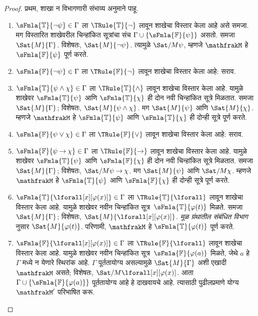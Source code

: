 \documentclass[11pt,a4paper,openany]{book}
\theoremstyle{definition}
\newcommand{\lif}{\mathbin{\to}}
\newcommand{\applytofirst}[2]{{\expandafter#1#2}}
\newcommand{\Struct}[1]{\applytofirst{\mathfrak}{#1}}
\newcommand{\True}{\ensuremath{\mathbb{T}}}
\newcommand{\False}{\ensuremath{\mathbb{F}}}
\newcommand{\readerexternalref}[1]{\textit{मूळ ग्रंथातील संबंधित विभाग}}
\begin{document}
\begin{proof}
प्रथम, शाखा न विभागणारी संभाव्य अनुमाने पाहू.
\begin{enumerate}
\item $\sFmla{\True}{\lnot \psi} \in \Gamma$ ला
  $\TRule{\True}{\lnot}$ लावून शाखेचा विस्तार केला आहे असे समजा. मग
  विस्तारित शाखेवरील चिन्हांकित सूत्रांचा संच $\Gamma \cup
  \{\sFmla{\False}{\psi}\}$ असतो. समजा
  $\Sat{M}{\Gamma}$. विशेषतः,
  $\Sat{M}{\lnot \psi}$. त्यामुळे
  $\Sat/{M}{\psi}$, म्हणजे
  $\Struct{M}$ हे
  $\sFmla{\False}{\psi}$ पूर्ण करते.
\item $\sFmla{\False}{\lnot \psi} \in \Gamma$ ला
  $\TRule{\False}{\lnot}$ लावून शाखेचा विस्तार केला आहे: सराव.
\item $\sFmla{\True}{\psi \land \chi} \in \Gamma$ ला
  $\TRule{\True}{\land}$ लावून शाखेचा विस्तार केला आहे. यामुळे शाखेवर
  $\sFmla{\True}{\psi}$ आणि $\sFmla{\True}{\chi}$ ही दोन नवी
  चिन्हांकित सूत्रे मिळतात. समजा
  $\Sat{M}{\Gamma}$; विशेषतः,
  $\Sat{M}{\psi \land \chi}$. मग
  $\Sat{M}{\psi}$ आणि
  $\Sat{M}{\chi}$. म्हणजे
  $\Struct{M}$ हे
  $\sFmla{\True}{\psi}$ आणि $\sFmla{\True}{\chi}$ ही दोन्ही सूत्रे पूर्ण करते.
\item $\sFmla{\False}{\psi \lor \chi} \in \Gamma$ ला
  $\TRule{\False}{\lor}$ लावून शाखेचा विस्तार केला आहे: सराव.
\item $\sFmla{\False}{\psi \lif \chi} \in \Gamma$ ला
  $\TRule{\False}{\lif}$ लावून शाखेचा विस्तार केला आहे. यामुळे शाखेवर
  $\sFmla{\True}{\psi}$ आणि $\sFmla{\False}{\chi}$ ही दोन नवी
  चिन्हांकित सूत्रे मिळतात. समजा
  $\Sat{M}{\Gamma}$; विशेषतः,
  $\Sat/{M}{\psi \lif \chi}$. मग
  $\Sat{M}{\psi}$ आणि
  $\Sat/{M}{\chi}$. म्हणजे
  $\Struct{M}$ हे
  $\sFmla{\True}{\psi}$ आणि $\sFmla{\False}{\chi}$ ही दोन्ही सूत्रे पूर्ण करते.


\item $\sFmla{\True}{\lforall[x][\varphi(x)]} \in \Gamma$ ला
  $\TRule{\True}{\lforall}$ लावून शाखेचा विस्तार केला आहे. यामुळे शाखेवर
  नवीन चिन्हांकित सूत्र~$\sFmla{\True}{\varphi(t)}$ मिळते.
  समजा $\Sat{M}{\Gamma}$; विशेषतः,
  $\Sat{M}{\lforall[x][\varphi(x)]}$.
  \readerexternalref{fol:syn:sem:prop:quant-terms} नुसार $\Sat{M}{\varphi(t)}$. परिणामी,
  $\Struct{M}$ हे $\sFmla{\True}{\varphi(t)}$ पूर्ण करते.

\item $\sFmla{\False}{\lforall[x][\varphi(x)]} \in \Gamma$ ला
  $\TRule{\False}{\lforall}$ लावून शाखेचा विस्तार केला आहे. यामुळे शाखेवर
  नवीन चिन्हांकित सूत्र~$\sFmla{\False}{\varphi(a)}$ मिळते, जेथे $a$ हे
  $\Gamma$ मध्ये न येणारे स्थिरांक आहे. $\Gamma$ पूर्ततायोग्य असल्यामुळे
  $\Sat{M}{\Gamma}$ अशी एखादी $\Struct{M}$ असते; विशेषतः,
  $\Sat/{M}{\lforall[x][\varphi(x)]}$. आता
  $\Gamma \cup \{\sFmla{\False}{\varphi(a)}\}$ पूर्ततायोग्य आहे हे दाखवायचे आहे.
  त्यासाठी पुढीलप्रमाणे योग्य~$\Struct{M'}$ परिभाषित करू.


\end{enumerate}
\end{proof}
\end{document}
